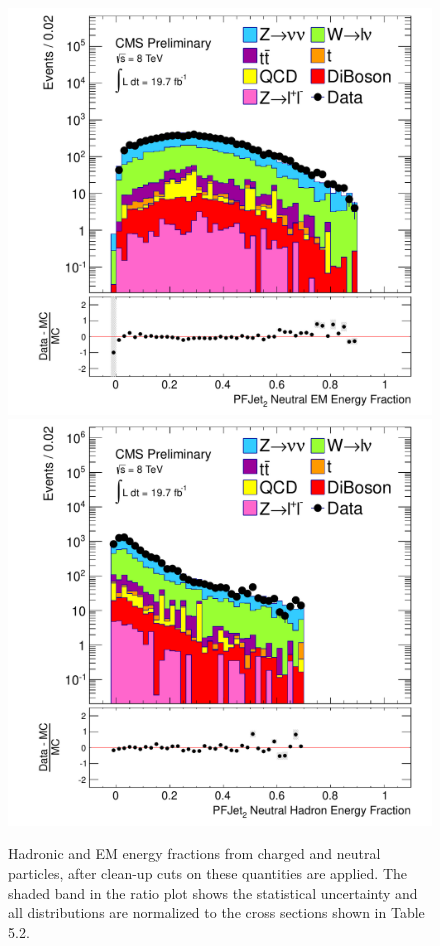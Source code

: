 \begin{figure}[!Hhtb]
\begin{center}
  \includegraphics[scale=0.31]     {Figures/sus13009/nocut/prelimLabels/cut/PFAK5JetNeuEmEngFrac2.pdf}
  \includegraphics[scale=0.31]     {Figures/sus13009/nocut/prelimLabels/cut/PFAK5JetNeuHadEngFrac2.pdf}
  \caption{Hadronic and EM energy fractions from charged 
and neutral particles, after clean-up cuts on these quantities are 
applied. 
The shaded band in the ratio plot shows the statistical uncertainty and all distributions are normalized to the cross sections shown in Table 5.2.
}
         \label{fig:ANA_energy_fraction_cleanup_cut}
  \end{center}
\end{figure}


